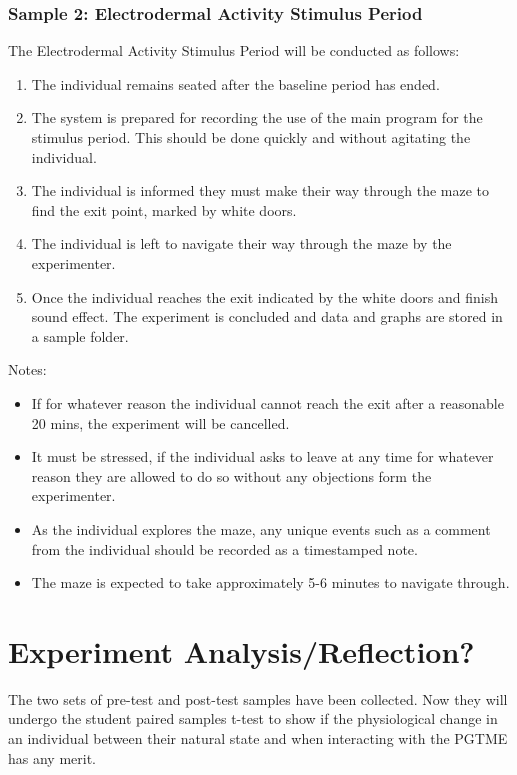 \documentclass{report}
\begin{document}
\subsection{Sample 2: Electrodermal Activity Stimulus Period}

The Electrodermal Activity Stimulus Period will be conducted as follows:

\begin{enumerate}
	\item The individual remains seated after the baseline period has ended.
	\item The system is prepared for recording the use of the main program for the stimulus period. This should be done quickly and without agitating the individual.
	\item The individual is informed they must make their way through the maze to find the exit point, marked by white doors.
	\item The individual is left to navigate their way through the maze by the experimenter.
	\item Once the individual reaches the exit indicated by the white doors and finish sound effect. The experiment is concluded and data and graphs are stored in a sample folder.
\end{enumerate}
Notes:
\begin{itemize}
	\item If for whatever reason the individual cannot reach the exit after a reasonable 20 mins, the experiment will be cancelled.
	\item It must be stressed, if the individual asks to leave at any time for whatever reason they are allowed to do so without any objections form the experimenter.
	\item As the individual explores the maze, any unique events such as a comment from the individual should be recorded as a timestamped note.
	\item The maze is expected to take approximately 5-6 minutes to navigate through.
\end{itemize}

\chapter{Experiment Analysis/Reflection?}
The two sets of pre-test and post-test samples have been collected. Now they will undergo the student paired samples t-test to show if the physiological change in an individual
between their natural state and when interacting with the PGTME has any merit.
\end{document}
